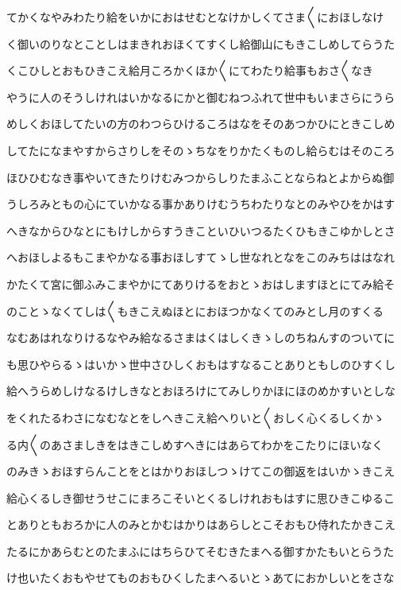 \documentclass[a4paper,11pt,landscape]{ltjtarticle}
\begin{document}
てかくなやみわたり給をいかにおはせむとなけかしくてさま〱におほしなけ
\par\medskip
く御いのりなとことしはまきれおほくてすくし給御山にもきこしめしてらうた
\par\medskip
くこひしとおもひきこえ給月ころかくほか〱にてわたり給事もおさ〱なき
\par\medskip
やうに人のそうしけれはいかなるにかと御むねつふれて世中もいまさらにうら
\par\medskip
めしくおほしてたいの方のわつらひけるころはなをそのあつかひにときこしめ
\par\medskip
してたになまやすからさりしをそのゝちなをりかたくものし給らむはそのころ
\par\medskip
ほひひむなき事やいてきたりけむみつからしりたまふことならねとよからぬ御
\par\medskip
うしろみともの心にていかなる事かありけむうちわたりなとのみやひをかはす
\par\medskip
へきなからひなとにもけしからすうきこといひいつるたくひもきこゆかしとさ
\par\medskip
へおほしよるもこまやかなる事おほしすてゝし世なれとなをこのみちははなれ
\par\medskip
かたくて宮に御ふみこまやかにてありけるをおとゝおはしますほとにてみ給そ
\par\medskip
のことゝなくてしは〱もきこえぬほとにおほつかなくてのみとし月のすくる
\par\medskip
なむあはれなりけるなやみ給なるさまはくはしくきゝしのちねんすのついてに
\par\medskip
も思ひやらるゝはいかゝ世中さひしくおもはすなることありともしのひすくし
\par\medskip
給へうらめしけなるけしきなとおほろけにてみしりかほにほのめかすいとしな
\par\medskip
をくれたるわさになむなとをしへきこえ給へりいと〱おしく心くるしくかゝ
\par\medskip
る内〱のあさましきをはきこしめすへきにはあらてわかをこたりにほいなく
\par\medskip
のみきゝおほすらんことをとはかりおほしつゝけてこの御返をはいかゝきこえ
\par\medskip
給心くるしき御せうせこにまろこそいとくるしけれおもはすに思ひきこゆるこ
\par\medskip
とありともおろかに人のみとかむはかりはあらしとこそおもひ侍れたかきこえ
\par\medskip
たるにかあらむとのたまふにはちらひてそむきたまへる御すかたもいとらうた
\par\medskip
け也いたくおもやせてものおもひくしたまへるいとゝあてにおかしいとをさな
\end{document}
